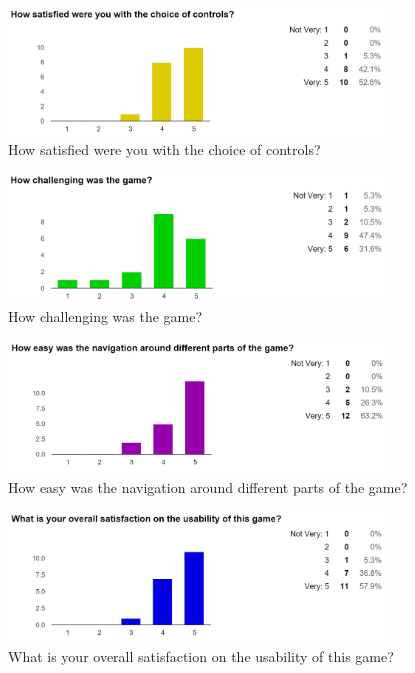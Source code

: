 \documentclass[12pt]{article}
\begin{document}
\begin{figure}[H]
	\centering
	\includegraphics[width = 10cm]{Controls}
	\caption{How satisfied were you with the choice of controls?}
	\label{How satisfied were you with the choice of controls?}
\end{figure}

\begin{figure}[H]
	\centering
	\includegraphics[width = 10cm]{Challenging}
	\caption{How challenging was the game?}
	\label{How challenging was the game?}
\end{figure}

\begin{figure}[H]
	\centering
	\includegraphics[width = 10cm]{Navigation}
	\caption{How easy was the navigation around different parts of the game?}
	\label{How easy was the navigation around different parts of the game?}
\end{figure}

\begin{figure}[H]
	\centering
	\includegraphics[width = 10cm]{Overall_Satisfaction}
	\caption{What is your overall satisfaction on the usability of this game?}
	\label{What is your overall satisfaction on the usability of this game?}
\end{figure}
\end{document}
